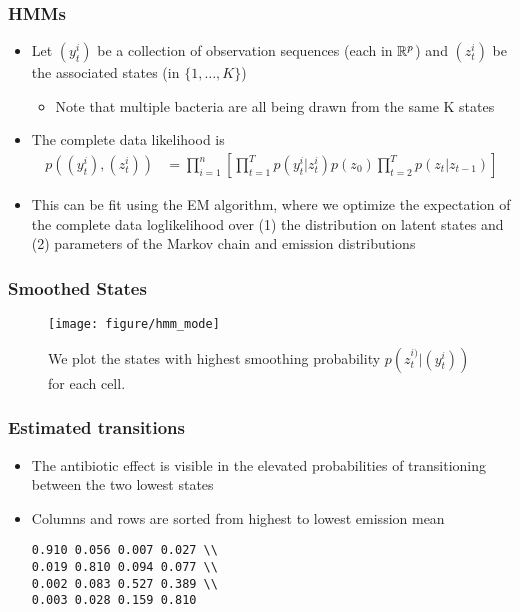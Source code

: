\documentclass{beamer}
\begin{document}
\begin{frame}
  \frametitle{HMMs}
\begin{itemize}
\item Let $\left(y_{t}^{i}\right)$ be a collection of observation sequences
  (each in $\mathbb{R}^{p}$) and $\left(z_{t}^{i}\right)$ be the associated states
  (in $\{1, \dots, K\}$)
  \begin{itemize}
  \item Note that multiple bacteria are all being drawn from the same K states
  \end{itemize}
\item The complete data likelihood is
  \begin{align*}
    p\left(\left(y_{t}^{i}\right), \left(z_{t}^{i}\right)\right) &= \prod_{i = 1}^{n} \left[\prod_{t = 1}^{T} p\left(y_{t}^{i} \vert z_{t}^{i}\right) p\left(z_{0}\right)\prod_{t = 2}^{T} p\left(z_{t} \vert z_{t - 1}\right)\right]
  \end{align*}
\item This can be fit using the EM algorithm, where we optimize the expectation
  of the complete data loglikelihood over (1) the distribution on latent states
  and (2) parameters of the Markov chain and emission distributions
\end{itemize}  
\end{frame}

\begin{frame}
  \frametitle{Smoothed States}
  \begin{figure}[ht]
  \centering
  \texttt{[image: figure/hmm\_mode]}
  \caption{We plot the states with highest smoothing probability
    $p\left(z_{t}^{i)} \vert \left(y_{t}^{i}\right)\right)$ for each cell.
    \label{fig:hmm_mode} }
\end{figure}
\end{frame}

\begin{frame}
  \frametitle{Estimated transitions}
  \begin{itemize}
    \item The antibiotic effect is visible in the elevated probabilities of
      transitioning between the two lowest states
      \item Columns and rows are sorted from highest to lowest emission mean
\begin{verbatim} 
0.910 0.056 0.007 0.027 \\
0.019 0.810 0.094 0.077 \\
0.002 0.083 0.527 0.389 \\
0.003 0.028 0.159 0.810 
\end{verbatim}
  \end{itemize}
\end{frame}
\end{document}
